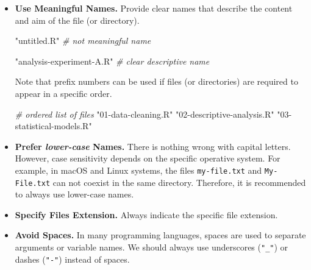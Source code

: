 \documentclass[
  11pt,
]{book}
\newenvironment{Shaded}{\begin{snugshade}}{\end{snugshade}}
\newcommand{\CommentTok}[1]{\textcolor[rgb]{0.56,0.35,0.01}{\textit{#1}}}
\newcommand{\StringTok}[1]{\textcolor[rgb]{0.31,0.60,0.02}{#1}}
\newenvironment{code-tex-bad}
  {\begingroup\definecolor{shadecolor}{RGB}{255, 189, 185}}
  {\endgroup}
\newenvironment{code-tex-good}
  {\begingroup\definecolor{shadecolor}{RGB}{224, 240, 227}}
  {\endgroup}
\begin{document}
\begin{itemize}
\item
  \textbf{Use Meaningful Names.} Provide clear names that describe the content and aim of the file (or directory).

  \begin{code-tex-bad}

\begin{Shaded}
\begin{Highlighting}[]
\StringTok{"untitled.R"} \CommentTok{\# not meaningful name}
\end{Highlighting}
\end{Shaded}

  \end{code-tex-bad}

  \begin{code-tex-good}

\begin{Shaded}
\begin{Highlighting}[]
\StringTok{"analysis{-}experiment{-}A.R"}        \CommentTok{\# clear descriptive name}
\end{Highlighting}
\end{Shaded}

  \end{code-tex-good}

  Note that prefix numbers can be used if files (or directories) are required to appear in a specific order.

  \begin{code-tex-good}

\begin{Shaded}
\begin{Highlighting}[]
\CommentTok{\# ordered list of files}
\StringTok{"01{-}data{-}cleaning.R"}        
\StringTok{"02{-}descriptive{-}analysis.R"}
\StringTok{"03{-}statistical{-}models.R"}
\end{Highlighting}
\end{Shaded}

  \end{code-tex-good}
\item
  \textbf{Prefer \emph{lower-case} Names.} There is nothing wrong with capital letters. However, case sensitivity depends on the specific operative system. For example, in macOS and Linux systems, the files \texttt{my-file.txt} and \texttt{My-File.txt} can not coexist in the same directory. Therefore, it is recommended to always use lower-case names.
\item
  \textbf{Specify Files Extension.} Always indicate the specific file extension.
\item
  \textbf{Avoid Spaces.} In many programming languages, spaces are used to separate arguments or variable names. We should always use underscores (\texttt{"\_"}) or dashes (\texttt{"-"}) instead of spaces.


\end{itemize}
\end{document}
